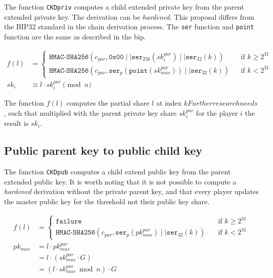 The function \texttt{CKDpriv} computes a child extended private key from the
parent extended private key. The derivation can be \textit{hardened}. This
proposal differs from the BIP32 \cite{HDWallets} standard in the chain
derivation process. The \texttt{ser} function and \texttt{point} function are
the same as described in the \gls{bip}.

\begin{equation*}
\begin{split}
  f(l) &=
  \begin{cases}
    \texttt{HMAC-SHA256}(c_{par}, \texttt{0x00}\mid\mid \texttt{ser}_{256}(sk_i^{par}) \mid\mid \texttt{ser}_{32}(k)) & \quad \text{if } k \geq 2^{31}\\
    \texttt{HMAC-SHA256}(c_{par}, \texttt{ser}_{p}(\texttt{point}(sk_{mas}^{par})) \mid\mid \texttt{ser}_{32}(k)) & \quad \text{if } k < 2^{31}
  \end{cases} \\
  sk_i &\equiv l \cdot sk_i^{par} \pmod n
\end{split}
\end{equation*}

The function $f(l)$ computes the partial share $l$ at index $kFurther research needs$, such that
multiplied with the parent private key share $sk_i^{par}$ for the player $i$ the
result is $sk_i$.

\subsection{Public parent key to public child key}

The function \texttt{CKDpub} computes a child extend public key from the parent
extended public key. It is worth noting that it is not possible to compute a
\textit{hardened} derivation without the private parent key, and
that every player updates the master public key for the threshold not their
public key share.

\begin{equation*}
\begin{split}
  f(l) &=
  \begin{cases}
    \texttt{failure} & \quad \text{if } k \geq 2^{31}\\
    \texttt{HMAC-SHA256}(c_{par}, \texttt{ser}_{p}(pk_{mas}^{par}) \mid\mid \texttt{ser}_{32}(k)) & \quad \text{if } k < 2^{31}
  \end{cases} \\
  pk_{mas} &= l \cdot pk_{mas}^{par}\\
      &= l \cdot (sk_{mas}^{par} \cdot G)\\
      &= (l \cdot sk_{mas}^{par} \bmod n) \cdot G
\end{split}
\end{equation*}


